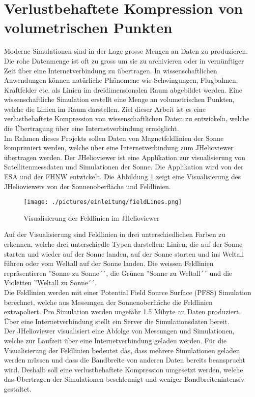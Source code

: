 \section{Verlustbehaftete Kompression von volumetrischen Punkten}
Moderne Simulationen sind in der Lage grosse Mengen an Daten zu produzieren. Die rohe Datenmenge ist oft zu gross um sie zu archivieren oder in vernünftiger Zeit über eine Internetverbindung zu übertragen. In wissenschaftlichen Anwendungen können natürliche Phänomene wie Schwingungen, Flugbahnen, Kraftfelder etc. als Linien im dreidimensionalen Raum abgebildet werden. Eine wissenschaftliche Simulation erstellt eine Menge an volumetrischen Punkten, welche die Linien im Raum darstellen. Ziel dieser Arbeit ist es eine verlustbehaftete Kompression von wissenschaftlichen Daten zu entwickeln, welche die Übertragung über eine Internetverbindung ermöglicht.\\
[\baselineskip]
Im Rahmen dieses Projekts sollen Daten von Magnetfeldlinien der Sonne komprimiert werden, welche über eine Internetverbindung zum JHelioviewer übertragen werden. Der JHelioviewer ist eine Applikation zur visualisierung von Satellitenmessdaten und Simulationen der Sonne. Die Applikation wird von der ESA und der FHNW entwickelt. Die Abbildung \ref{einleitung::feldlinien} zeigt eine Visualisierung des JHelioviewers von der Sonnenoberfläche und Feldlinien.\\
\begin{figure}[!htbp]
\center
	\texttt{[image: ./pictures/einleitung/fieldLines.png]}
	\caption{Visualisierung der Feldlinien im JHelioviewer}
	\label{einleitung::feldlinien}
\end{figure}
Auf der Visualisierung sind Feldlinien in drei unterschiedlichen Farben zu erkennen, welche drei unterschiedle Typen darstellen: Linien, die auf der Sonne starten und wieder auf der Sonne landen, auf der Sonne starten und ins Weltall führen oder vom Weltall auf der Sonne landen. Die weissen Feldlinien repräsentieren ''Sonne zu Sonne´´, die Grünen ''Sonne zu Weltall´´ und die Violetten ''Weltall zu Sonne´´.\\
[\baselineskip]
Die Feldlinien werden mit einer Potential Field Source Surface (PFSS) Simulation berechnet, welche aus Messungen der Sonnenoberfläche die Feldlinien extrapoliert. Pro Simulation werden ungefähr 1.5 Mibyte an Daten produziert. Über eine Internetverbindung stellt ein Server die Simulationsdaten bereit.\\
Der JHelioviewer visualisiert eine Abfolge von Messungen und Simulationen, welche zur Laufzeit über eine Internetverbindung geladen werden. Für die Visualisierung der Feldlinien bedeutet das, dass mehrere Simulationen geladen werden müssen und dass die Bandbreite von anderen Daten bereits beansprucht wird. Deshalb soll eine verlustbehaftete Kompression umgesetzt werden, welche das Übertragen der Simulationen beschleunigt und weniger Bandbreitenintensiv gestaltet.\\
